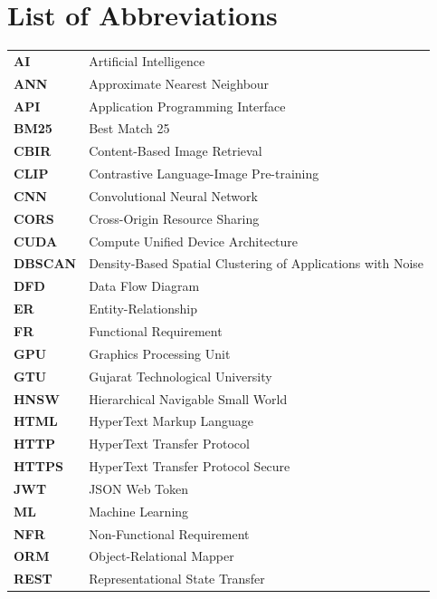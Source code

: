 \documentclass[12pt,a4paper,oneside]{report}
\begin{document}
\chapter*{List of Abbreviations}

\begin{longtable}{p{3.2cm} p{10.5cm}}
\textbf{AI}     & Artificial Intelligence \\
\textbf{ANN}    & Approximate Nearest Neighbour \\
\textbf{API}    & Application Programming Interface \\
\textbf{BM25}   & Best Match 25 \\
\textbf{CBIR}   & Content-Based Image Retrieval \\
\textbf{CLIP}   & Contrastive Language-Image Pre-training \\
\textbf{CNN}    & Convolutional Neural Network \\
\textbf{CORS}   & Cross-Origin Resource Sharing \\
\textbf{CUDA}   & Compute Unified Device Architecture \\
\textbf{DBSCAN} & Density-Based Spatial Clustering of Applications with Noise \\
\textbf{DFD}    & Data Flow Diagram \\
\textbf{ER}     & Entity-Relationship \\
\textbf{FR}     & Functional Requirement \\
\textbf{GPU}    & Graphics Processing Unit \\
\textbf{GTU}    & Gujarat Technological University \\
\textbf{HNSW}   & Hierarchical Navigable Small World \\
\textbf{HTML}   & HyperText Markup Language \\
\textbf{HTTP}   & HyperText Transfer Protocol \\
\textbf{HTTPS}  & HyperText Transfer Protocol Secure \\
\textbf{JWT}    & JSON Web Token \\
\textbf{ML}     & Machine Learning \\
\textbf{NFR}    & Non-Functional Requirement \\
\textbf{ORM}    & Object-Relational Mapper \\
\textbf{REST}   & Representational State Transfer \\

\end{longtable}
\end{document}
